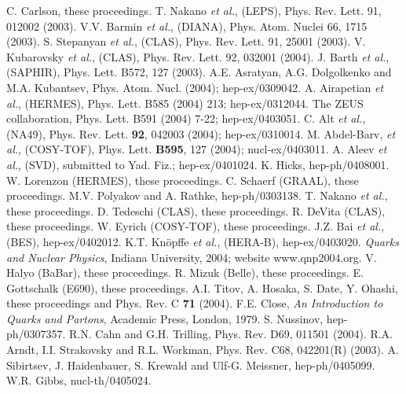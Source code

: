 \documentclass{ws-procs9x6}
\begin{document}
\newcommand{\etal}{{\it et al.}, }
\begin{thebibliography}{0}
 C. Carlson, these proceedings.
%
 T. Nakano \etal (LEPS), 
        Phys. Rev. Lett. 91, 012002 (2003).
 V.V. Barmin \etal (DIANA),
	Phys. Atom. Nuclei 66, 1715 (2003).
 S. Stepanyan \etal (CLAS), 
	Phys. Rev. Lett. 91, 25001 (2003).
 V. Kubarovsky \etal (CLAS),
        Phys. Rev. Lett. 92, 032001 (2004).
 J. Barth \etal (SAPHIR),
	Phys. Lett. B572, 127 (2003).
 A.E. Asratyan, A.G. Dolgolkenko and M.A. Kubantsev,
        Phys. Atom. Nucl. (2004); hep-ex/0309042.
 A. Airapetian \etal (HERMES), 
        Phys. Lett. B585 (2004) 213; hep-ex/0312044.
 The ZEUS collaboration, 
        Phys. Lett. B591 (2004) 7-22; hep-ex/0403051.
 C. Alt \etal (NA49),
	Phys. Rev. Lett. {\bf 92}, 042003 (2004);
	hep-ex/0310014.
 M. Abdel-Barv, \etal (COSY-TOF), 
        Phys. Lett. {\bf B595}, 127 (2004);
	nucl-ex/0403011.
 A. Aleev \etal (SVD), submitted to Yad. Fiz.;
	hep-ex/0401024.
 K. Hicks, hep-ph/0408001.
 W. Lorenzon (HERMES), these proceedings.
 C. Schaerf (GRAAL), these proceedings.
 M.V. Polyakov and A. Rathke, hep-ph/0303138.
 T. Nakano \etal these proceedings.
 D. Tedeschi (CLAS), these proceedings.
 R. DeVita (CLAS), these proceedings.
 W. Eyrich (COSY-TOF), these proceedings.
%
 J.Z. Bai \etal (BES), hep-ex/0402012.
 K.T. Kn\"opffe \etal (HERA-B), hep-ex/0403020.
 {\it Quarks and Nuclear Physics}, Indiana University, 
	2004; website www.qnp2004.org.
 V. Halyo (BaBar), these proceedings.
 R. Mizuk (Belle), these proceedings.
 E. Gottschalk (E690), these proceedings.
 A.I. Titov, A. Hosaka, S. Date, Y. Ohashi, these proceedings 
	and Phys. Rev. C {\bf 71} (2004).
 F.E. Close, {\it An Introduction to Quarks and Partons}, 
	Academic Press, London, 1979.
%
 S. Nussinov, hep-ph/0307357.
 R.N. Cahn and G.H. Trilling, 
               Phys. Rev. D69, 011501 (2004).
 R.A. Arndt, I.I. Strakovsky and R.L. Workman, 
                Phys. Rev. C68, 042201(R) (2003).
 A. Sibirtsev, J. Haidenbauer, S. Krewald and 
         Ulf-G. Meissner, hep-ph/0405099.
 W.R. Gibbs, nucl-th/0405024.

\end{thebibliography}
\end{document}
